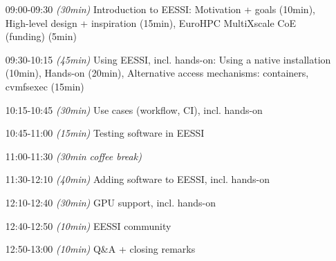 \begin{itemize}[style=standard, labelwidth=1.9cm]


    \item [09:00-09:30] \emph{(30min)} Introduction to EESSI: Motivation + goals (10min), High-level design + inspiration (15min), EuroHPC MultiXscale CoE (funding) (5min)
    \item [09:30-10:15] \emph{(45min)} Using EESSI, incl. hands-on: Using a native installation (10min), Hands-on (20min), Alternative access mechanisms: containers, cvmfsexec (15min)
    \item [10:15-10:45] \emph{(30min)} Use cases (workflow, CI), incl. hands-on
    \item [10:45-11:00] \emph{(15min)} Testing software in EESSI
    \item [11:00-11:30] \emph{(30min coffee break)}
    \item [11:30-12:10] \emph{(40min)} Adding software to EESSI, incl. hands-on
    \item [12:10-12:40] \emph{(30min)} GPU support, incl. hands-on
    \item [12:40-12:50] \emph{(10min)} EESSI community
    \item [12:50-13:00] \emph{(10min)} Q\&A + closing remarks

\end{itemize}

